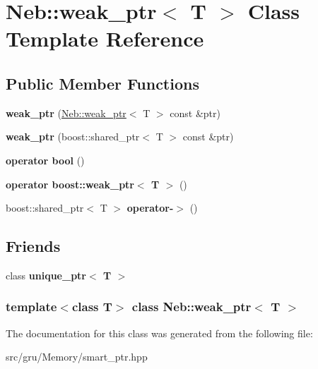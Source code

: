 \hypertarget{classNeb_1_1weak__ptr}{\section{\-Neb\-:\-:weak\-\_\-ptr$<$ \-T $>$ \-Class \-Template \-Reference}
\label{classNeb_1_1weak__ptr}
}
\subsection*{\-Public \-Member \-Functions}
\begin{DoxyCompactItemize}
\item 
\hypertarget{classNeb_1_1weak__ptr_a831fec6c1355a9d91e834099c0dc6227}{{\bfseries weak\-\_\-ptr} (\hyperlink{classNeb_1_1weak__ptr}{\-Neb\-::weak\-\_\-ptr}$<$ \-T $>$ const \&ptr)}\label{classNeb_1_1weak__ptr_a831fec6c1355a9d91e834099c0dc6227}

\item 
\hypertarget{classNeb_1_1weak__ptr_ad29ba574546701e7ed8a0b452dcd76a6}{{\bfseries weak\-\_\-ptr} (boost\-::shared\-\_\-ptr$<$ \-T $>$ const \&ptr)}\label{classNeb_1_1weak__ptr_ad29ba574546701e7ed8a0b452dcd76a6}

\item 
\hypertarget{classNeb_1_1weak__ptr_a04c92f7e5ec8e3e83d2abce8365b8feb}{{\bfseries operator bool} ()}\label{classNeb_1_1weak__ptr_a04c92f7e5ec8e3e83d2abce8365b8feb}

\item 
\hypertarget{classNeb_1_1weak__ptr_ab67828010c104deb340eb460148b651d}{{\bfseries operator boost\-::weak\-\_\-ptr$<$ T $>$} ()}\label{classNeb_1_1weak__ptr_ab67828010c104deb340eb460148b651d}

\item 
\hypertarget{classNeb_1_1weak__ptr_afb380fd10451d5f26809091e54cde62f}{boost\-::shared\-\_\-ptr$<$ \-T $>$ {\bfseries operator-\/$>$} ()}\label{classNeb_1_1weak__ptr_afb380fd10451d5f26809091e54cde62f}

\end{DoxyCompactItemize}
\subsection*{\-Friends}
\begin{DoxyCompactItemize}
\item 
\hypertarget{classNeb_1_1weak__ptr_af421c41ed797729bb606ba7df50551aa}{class {\bfseries unique\-\_\-ptr$<$ T $>$}}\label{classNeb_1_1weak__ptr_af421c41ed797729bb606ba7df50551aa}

\end{DoxyCompactItemize}
\subsubsection*{template$<$class \-T$>$ class Neb\-::weak\-\_\-ptr$<$ T $>$}



\-The documentation for this class was generated from the following file\-:\begin{DoxyCompactItemize}
\item 
src/gru/\-Memory/smart\-\_\-ptr.\-hpp\end{DoxyCompactItemize}

